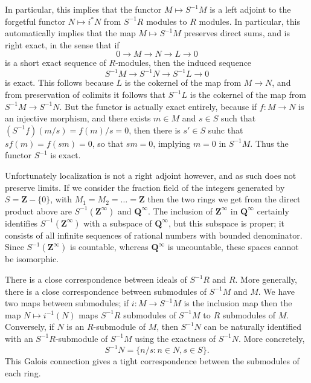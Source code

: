 In particular, this implies that the functor $M \mapsto S^{-1}M$ is a left adjoint to the forgetful functor $N \mapsto i^* N$ from $S^{-1}R$ modules to $R$ modules. In particular, this automatically implies that the map $M \mapsto S^{-1}M$ preserves direct sums, and is right exact, in the sense that if
%
\[ 0 \to M \to N \to L \to 0 \]
%
is a short exact sequence of $R$-modules, then the induced sequence
%
\[ S^{-1}M \to S^{-1}N \to S^{-1}L \to 0 \]
%
is exact. This follows because $L$ is the cokernel of the map from $M \to N$, and from preservation of colimits it follows that $S^{-1}L$ is the cokernel of the map from $S^{-1}M \to S^{-1}N$. But the functor is actually exact entirely, because if $f: M \to N$ is an injective morphism, and there exists $m \in M$ and $s \in S$ such that $(S^{-1}f)(m/s) = f(m)/s = 0$, then there is $s' \in S$ suhc that $s f(m) = f(sm) = 0$, so that $sm = 0$, implying $m = 0$ in $S^{-1}M$. Thus the functor $S^{-1}$ is exact.

\begin{remark}
    Unfortunately localization is not a right adjoint however, and as such does not preserve limits. If we consider the fraction field of the integers generated by $S = \mathbf{Z} - \{ 0 \}$, with $M_1 = M_2 = \dots = \mathbf{Z}$ then the two rings we get from the direct product above are $S^{-1}(\mathbf{Z}^\infty)$ and $\mathbf{Q}^\infty$. The inclusion of $\mathbf{Z}^\infty$ in $\mathbf{Q}^\infty$ certainly identifies $S^{-1}(\mathbf{Z}^\infty)$ with a subspace of $\mathbf{Q}^\infty$, but this subspace is proper; it consists of all infinite sequences of rational numbers with bounded denominator. Since $S^{-1}(\mathbf{Z}^\infty)$ is countable, whereas $\mathbf{Q}^\infty$ is uncountable, these spaces cannot be isomorphic.
\end{remark}

There is a close correspondence between ideals of $S^{-1}R$ and $R$. More generally, there is a close correspondence between submodules of $S^{-1}M$ and $M$. We have two maps between submodules; if $i: M \to S^{-1}M$ is the inclusion map then the map $N \mapsto i^{-1}(N)$ maps $S^{-1}R$ submodules of $S^{-1}M$ to $R$ submodules of $M$. Conversely, if $N$ is an $R$-submodule of $M$, then $S^{-1}N$ can be naturally identified with an $S^{-1}R$-submodule of $S^{-1}M$ using the exactness of $S^{-1}N$. More concretely,
%
\[ S^{-1}N = \{ n/s : n \in N, s \in S \}. \]
%
This Galois connection gives a tight correspondence between the submodules of each ring.

